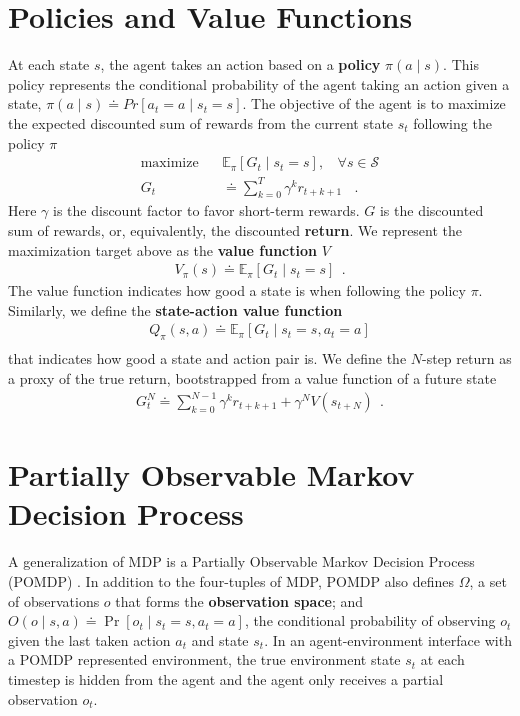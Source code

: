 \section{Policies and Value Functions} \label{sec:policies_and_functions}
At each state $s$, the agent takes an action based on a \textbf{policy} $\pi(a \mid s)$.
This policy represents the conditional probability of the agent taking an action given a state, $\pi(a \mid s) \doteq Pr[ a_{t} = a \mid  s_t = s]$.
The objective of the agent is to maximize the expected discounted sum of rewards from the current state $s_t$ following the policy $\pi$
\begin{align}
    \text{maximize} ~~~~  & \mathbb{E}_{\pi}\left[ G_t \mid s_t = s \right] , ~~~~ \forall s \in \mathcal{S} \label{eq:maximize_return} \\
    G_t                   & \doteq \sum_{k=0}^{T} \gamma^{k} r_{t+k+1} ~~~~ . 
\end{align}
Here $\gamma$ is the discount factor to favor short-term rewards.
$G$ is the discounted sum of rewards, or, equivalently, the discounted \textbf{return}.
We represent the maximization target above as the \textbf{value function} $V$
\begin{align*}
    V_\pi(s) \doteq \mathbb{E}_{\pi}\left[ G_t \mid s_t = s \right] ~~.
\end{align*}
The value function indicates how good a state is when following the policy $\pi$.
Similarly, we define the \textbf{state-action value function}
\begin{align*}
    Q_\pi(s, a) \doteq \mathbb{E}_{\pi}\left[ G_t \mid s_t = s, a_t = a \right]  \\
\end{align*}
that indicates how good a state and action pair is.
We define the $N$-step return as a proxy of the true return, bootstrapped from a value function of a future state
\begin{align*}
    G^N_t \doteq \sum_{k=0}^{N - 1} \gamma^{k} r_{t+k+1} + \gamma^{N} V(s_{t+N}) ~~ .
\end{align*}

\section{Partially Observable Markov Decision Process} \label{sec:pomdp}
A generalization of MDP is a Partially Observable Markov Decision Process (POMDP) \cite{OptimalControlMarkov_Astrom_1965}.
In addition to the four-tuples of MDP, POMDP also defines $\Omega$, a set of observations $o$ that forms the \textbf{observation space}; and $O(o \mid s, a) \doteq \operatorname{Pr}[o_t \mid s_t = s, a_t = a]$, the conditional probability of observing $o_t$ given the last taken action $a_t$ and state $s_t$.
In an agent-environment interface with a POMDP represented environment, the true environment state $s_t$ at each timestep is hidden from the agent and the agent only receives a partial observation $o_t$.

